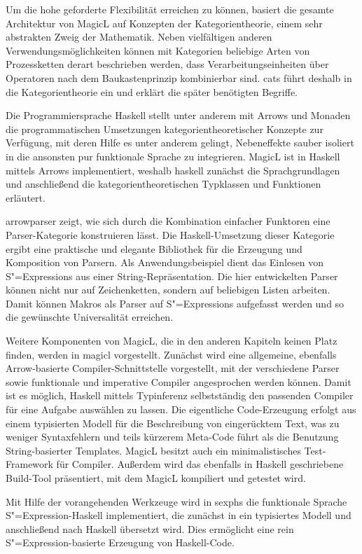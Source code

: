 \documentclass[11pt, a4paper, bibgerm]{scrbook}
\newcommand\cref{}
\newcommand{\sexp}{S"=Expression}
\newcommand{\sexps}{S"=Expressions}
\begin{document}
Um die hohe geforderte Flexibilität erreichen zu können, basiert die
gesamte Architektur von MagicL auf Konzepten der Kategorientheorie,
einem sehr abstrakten Zweig der Mathematik. Neben vielfältigen anderen
Verwendungsmöglichkeiten können mit Kategorien beliebige Arten von
Prozessketten derart beschrieben werden, dass Verarbeitungseinheiten
über Operatoren nach dem Baukastenprinzip kombinierbar sind. \cref{cats}
führt deshalb in die Kategorientheorie ein und erklärt die später
benötigten Begriffe.

Die Programmiersprache Haskell stellt unter anderem mit Arrows und
Monaden die programmatischen Umsetzungen kategorientheoretischer
Konzepte zur Verfügung, mit deren Hilfe es unter anderem gelingt,
Nebeneffekte sauber isoliert in die ansonsten pur funktionale Sprache zu
integrieren. MagicL ist in Haskell mittels Arrows implementiert, weshalb
\cref{haskell} zunächst die Sprachgrundlagen und anschließend die
kategorientheoretischen Typklassen und Funktionen erläutert.

\cref{arrowparser} zeigt, wie sich durch die Kombination einfacher
Funktoren eine Parser-Kategorie konstruieren lässt. Die
Haskell-Umsetzung dieser Kategorie ergibt eine praktische und elegante
Bibliothek für die Erzeugung und Komposition von Parsern. Als
Anwendungsbeispiel dient das Einlesen von \sexps{} aus einer
String-Repräsentation. Die hier entwickelten Parser können nicht nur auf
Zeichenketten, sondern auf beliebigen Listen arbeiten. Damit können
Makros als Parser auf \sexps{} aufgefasst werden und so die
gewünschte Universalität erreichen.

Weitere Komponenten von MagicL, die in den anderen Kapiteln keinen Platz
finden, werden in \cref{magicl} vorgestellt. Zunächst wird eine
allgemeine, ebenfalls Arrow-basierte Compiler-Schnittstelle vorgestellt,
mit der verschiedene Parser sowie funktionale und imperative Compiler
angesprochen werden können. Damit ist es möglich, Haskell mittels
Typinferenz selbstständig den passenden Compiler für eine Aufgabe
auswählen zu lassen.  Die eigentliche Code-Erzeugung erfolgt aus einem
typisierten Modell für die Beschreibung von eingerücktem Text, was zu
weniger Syntaxfehlern und teils kürzerem Meta-Code führt als die
Benutzung String-basierter Templates. MagicL besitzt auch ein
minimalistisches Test-Framework für Compiler. Außerdem wird das
ebenfalls in Haskell geschriebene Build-Tool präsentiert, mit dem MagicL
kompiliert und getestet wird.

Mit Hilfe der vorangehenden Werkzeuge wird in \cref{sexphs} die
funktionale Sprache \sexp{}-Haskell implementiert, die zunächst in ein
typisiertes Modell und anschließend nach Haskell übersetzt wird. Dies
ermöglicht eine rein \sexp{}-basierte Erzeugung von Haskell-Code.
\end{document}
